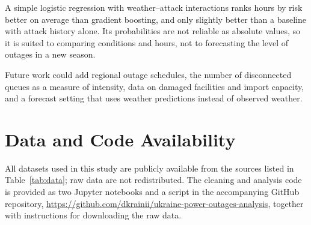\documentclass[9pt,twocolumn,letterpaper]{extarticle}
\begin{document}
A simple logistic regression with weather--attack interactions ranks hours by risk better on average than gradient boosting, and only slightly better than a baseline with attack history alone. Its probabilities are not reliable as absolute values, so it is suited to comparing conditions and hours, not to forecasting the level of outages in a new season.

Future work could add regional outage schedules, the number of disconnected queues as a measure of intensity, data on damaged facilities and import capacity, and a forecast setting that uses weather predictions instead of observed weather.

\section*{Data and Code Availability}
All datasets used in this study are publicly available from the sources listed in Table~\ref{tab:data}; raw data are not redistributed. The cleaning and analysis code is provided as two Jupyter notebooks and a script in the accompanying GitHub repository, \url{https://github.com/dkrainii/ukraine-power-outages-analysis}, together with instructions for downloading the raw data.
\end{document}

